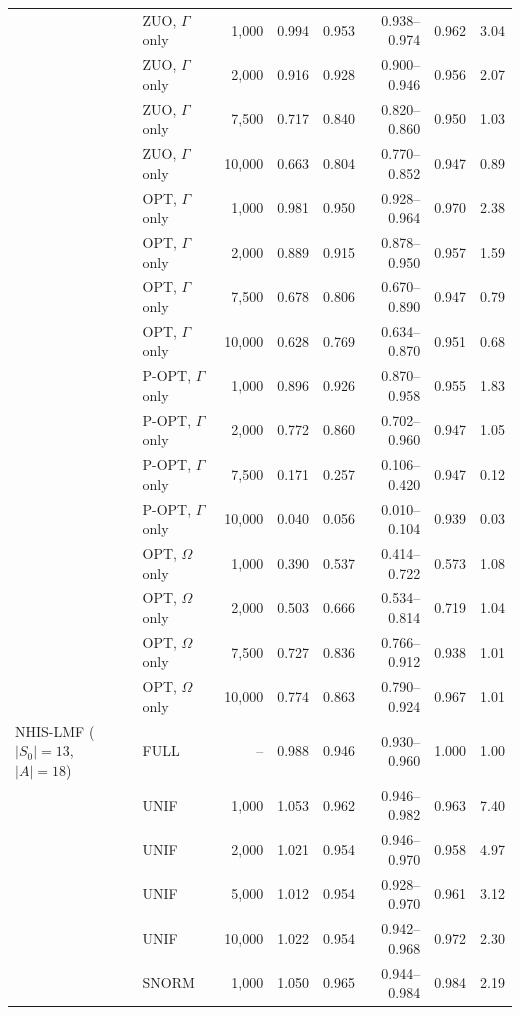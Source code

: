 \begin{tabular}{llrrrrrr}
 & ZUO, \(\Gamma\) only & 1,000 & 0.994 & 0.953 & 0.938--0.974 & 0.962 & 3.04\\
 & ZUO, \(\Gamma\) only & 2,000 & 0.916 & 0.928 & 0.900--0.946 & 0.956 & 2.07\\
 & ZUO, \(\Gamma\) only & 7,500 & 0.717 & 0.840 & 0.820--0.860 & 0.950 & 1.03\\
 & ZUO, \(\Gamma\) only & 10,000 & 0.663 & 0.804 & 0.770--0.852 & 0.947 & 0.89\\
 & OPT, \(\Gamma\) only & 1,000 & 0.981 & 0.950 & 0.928--0.964 & 0.970 & 2.38\\
 & OPT, \(\Gamma\) only & 2,000 & 0.889 & 0.915 & 0.878--0.950 & 0.957 & 1.59\\
 & OPT, \(\Gamma\) only & 7,500 & 0.678 & 0.806 & 0.670--0.890 & 0.947 & 0.79\\
 & OPT, \(\Gamma\) only & 10,000 & 0.628 & 0.769 & 0.634--0.870 & 0.951 & 0.68\\
 & P-OPT, \(\Gamma\) only & 1,000 & 0.896 & 0.926 & 0.870--0.958 & 0.955 & 1.83\\
 & P-OPT, \(\Gamma\) only & 2,000 & 0.772 & 0.860 & 0.702--0.960 & 0.947 & 1.05\\
 & P-OPT, \(\Gamma\) only & 7,500 & 0.171 & 0.257 & 0.106--0.420 & 0.947 & 0.12\\
 & P-OPT, \(\Gamma\) only & 10,000 & 0.040 & 0.056 & 0.010--0.104 & 0.939 & 0.03\\
 & OPT, \(\Omega\) only & 1,000 & 0.390 & 0.537 & 0.414--0.722 & 0.573 & 1.08\\
 & OPT, \(\Omega\) only & 2,000 & 0.503 & 0.666 & 0.534--0.814 & 0.719 & 1.04\\
 & OPT, \(\Omega\) only & 7,500 & 0.727 & 0.836 & 0.766--0.912 & 0.938 & 1.01\\
 & OPT, \(\Omega\) only & 10,000 & 0.774 & 0.863 & 0.790--0.924 & 0.967 & 1.01\\
\addlinespace
NHIS-LMF (\(|S_0|=13\), \(|A|=18\)) & FULL & -- & 0.988 & 0.946 & 0.930--0.960 & 1.000 & 1.00\\
 & UNIF & 1,000 & 1.053 & 0.962 & 0.946--0.982 & 0.963 & 7.40\\
 & UNIF & 2,000 & 1.021 & 0.954 & 0.946--0.970 & 0.958 & 4.97\\
 & UNIF & 5,000 & 1.012 & 0.954 & 0.928--0.970 & 0.961 & 3.12\\
 & UNIF & 10,000 & 1.022 & 0.954 & 0.942--0.968 & 0.972 & 2.30\\
 & SNORM & 1,000 & 1.050 & 0.965 & 0.944--0.984 & 0.984 & 2.19\\

\end{tabular}
